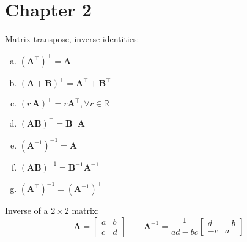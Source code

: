 \documentclass[11pt]{article}
\newcommand{\R}{\mathbb{R}}
\newcommand{\A}{\mathbf{A}}
\begin{document}
\section{Chapter 2}

 Matrix transpose, inverse identities:
 \begin{enumerate} [a)]
   \item $(\A^\intercal)^\intercal = \A$
   \item $(\A + \mathbf{B})^\intercal = \A^\intercal + \mathbf{B}^\intercal$
   \item $(r \, \A)^\intercal = r\A^\intercal, \forall r \in \R$
   \item $(\A \mathbf{B})^\intercal = \mathbf{B}^\intercal \A^\intercal$
   \item $(\A^{-1})^{-1} = \A$
   \item $(\A \mathbf{B})^{-1} = \mathbf{B}^{-1} \A^{-1}$
   \item $(\A^\intercal)^{-1} = (\A^{-1})^\intercal$
 \end{enumerate}
 
\noindent {} Inverse of a $2 \times 2$ matrix:
$$
\A = 
\begin{bmatrix}
    a & b \\
    c & d 
\end{bmatrix}
\qquad
\A^{-1} = 
\frac{1}{ad-bc}
\begin{bmatrix}
    d & -b \\
    -c & a 
\end{bmatrix}
$$


\newpage
\end{document}
